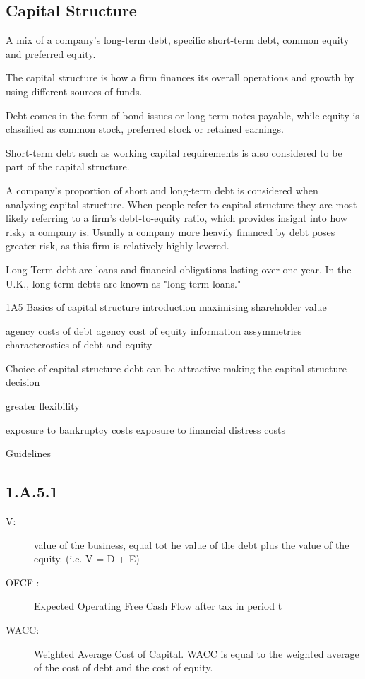 \subsection*{Capital Structure}


A mix of a company's long-term debt, specific short-term debt, common equity and preferred equity. 


The capital structure is how a firm finances its overall operations and growth by using different sources of funds.


Debt comes in the form of bond issues or long-term notes payable, while equity is classified as common stock, preferred stock or retained earnings. 


Short-term debt such as working capital requirements is also considered to be part of the capital structure.


A company's proportion of short and long-term debt is considered when analyzing capital structure. When people refer to capital structure they are most likely referring to a firm's debt-to-equity ratio, which provides insight into how risky a company is. Usually a company more heavily financed by debt poses greater risk, as this firm is relatively highly levered.


Long Term debt are loans and financial obligations lasting over one year. In the U.K., long-term debts are known as "long-term loans."



1A5
Basics of capital structure
introduction
maximising shareholder value

agency costs of debt
agency cost of equity
information assymmetries
characterostics
of debt and equity

Choice of capital structure
debt can be attractive
making the capital structure decision

greater flexibility

exposure to bankruptcy costs
exposure to financial distress costs

Guidelines



\subsection*{1.A.5.1}
\begin{description}
\item[V:] value of the business, equal tot he value of the debt plus the value of the equity. (i.e. V = D + E)
\item[OFCF :]  Expected Operating Free Cash Flow after tax in period t
\item[WACC:] Weighted Average Cost of Capital. WACC is equal to the weighted average of the cost of debt and the cost of equity.
\end{description}


